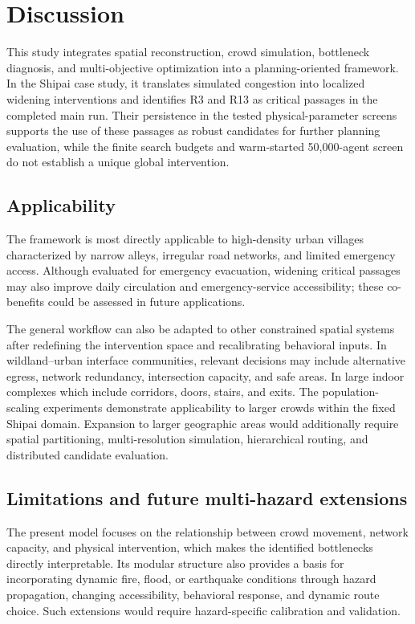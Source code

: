\documentclass[preprint,12pt]{elsarticle}
\begin{document}
{\color{blue}

\section{Discussion}
\label{sec:discussion_revised}

This study integrates spatial reconstruction, crowd simulation, bottleneck diagnosis, and multi-objective optimization into a planning-oriented framework. In the Shipai case study, it translates simulated congestion into localized widening interventions and identifies R3 and R13 as critical passages in the completed main run. Their persistence in the tested physical-parameter screens supports the use of these passages as robust candidates for further planning evaluation, while the finite search budgets and warm-started 50,000-agent screen do not establish a unique global intervention.

\subsection{Applicability}

The framework is most directly applicable to high-density urban villages characterized by narrow alleys, irregular road networks, and limited emergency access. Although evaluated for emergency evacuation, widening critical passages may also improve daily circulation and emergency-service accessibility; these co-benefits could be assessed in future applications.

The general workflow can also be adapted to other constrained spatial systems after redefining the intervention space and recalibrating behavioral inputs. In wildland--urban interface communities, relevant decisions may include alternative egress, network redundancy, intersection capacity, and safe areas. In large indoor complexes which include corridors, doors, stairs, and exits. The population-scaling experiments demonstrate applicability to larger crowds within the fixed Shipai domain. Expansion to larger geographic areas would additionally require spatial partitioning, multi-resolution simulation, hierarchical routing, and distributed candidate evaluation.

\subsection{Limitations and future multi-hazard extensions}

The present model focuses on the relationship between crowd movement, network capacity, and physical intervention, which makes the identified bottlenecks directly interpretable. Its modular structure also provides a basis for incorporating dynamic fire, flood, or earthquake conditions through hazard propagation, changing accessibility, behavioral response, and dynamic route choice. Such extensions would require hazard-specific calibration and validation.

}
\end{document}
